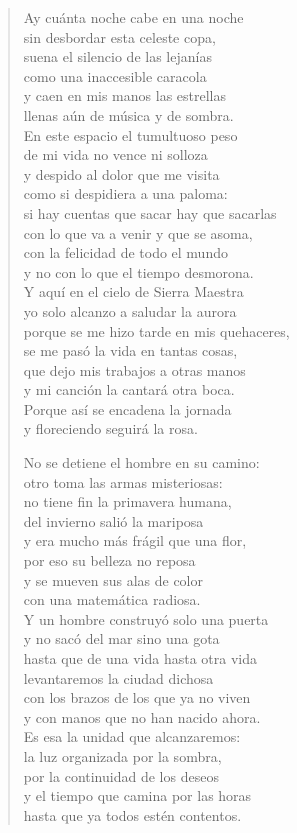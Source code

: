 \documentclass[12pt]{article}
\begin{document}
\begin{verse}
Ay cuánta noche cabe en una noche\\
sin desbordar esta celeste copa,\\
suena el silencio de las lejanías\\
como una inaccesible caracola\\
y caen en mis manos las estrellas\\
llenas aún de música y de sombra.\\
En este espacio el tumultuoso peso\\
de mi vida no vence ni solloza\\
y despido al dolor que me visita\\
como si despidiera a una paloma:\\
si hay cuentas que sacar hay que sacarlas\\
con lo que va a venir y que se asoma,\\
con la felicidad de todo el mundo\\
y no con lo que el tiempo desmorona.\\
Y aquí en el cielo de Sierra Maestra\\
yo solo alcanzo a saludar la aurora\\
porque se me hizo tarde en mis quehaceres,\\
se me pasó la vida en tantas cosas,\\
que dejo mis trabajos a otras manos\\
y mi canción la cantará otra boca.\\
Porque así se encadena la jornada\\
y floreciendo seguirá la rosa.  

No se detiene el hombre en su camino:\\
otro toma las armas misteriosas:\\
no tiene fin la primavera humana,\\
del invierno salió la mariposa\\
y era mucho más frágil que una flor,\\
por eso su belleza no reposa\\
y se mueven sus alas de color\\
con una matemática radiosa.\\
Y un hombre construyó solo una puerta\\
y no sacó del mar sino una gota\\
hasta que de una vida hasta otra vida\\
levantaremos la ciudad dichosa\\
con los brazos de los que ya no viven\\
y con manos que no han nacido ahora.\\
Es esa la unidad que alcanzaremos:\\
la luz organizada por la sombra,\\
por la continuidad de los deseos\\
y el tiempo que camina por las horas\\
hasta que ya todos estén contentos.  


\end{verse}
\end{document}
